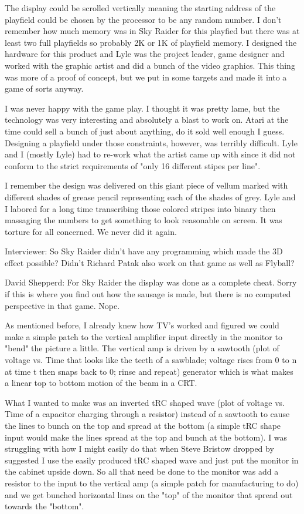 The display could be scrolled vertically meaning the starting address of the playfield could be chosen by the processor to be any random number. I don't remember how much memory was in Sky Raider for this playfied but there was at least two full playfields so probably 2K or 1K of playfield memory. I designed the hardware for this product and Lyle was the project leader, game designer and worked with the graphic artist and did a bunch of the video graphics. This thing was more of a proof of concept, but we put in some targets and made it into a game of sorts anyway. 

I was never happy with the game play. I thought it was pretty lame, but the technology was very interesting and absolutely a blast to work on. Atari at the time could sell a bunch of just about anything, do it sold well enough I guess. Designing a playfield under those constraints, however, was terribly difficult. Lyle and I (mostly Lyle) had to re-work what the artist came up with since it did not conform to the strict requirements of "only 16 different stipes per line". 

I remember the design was delivered on this giant piece of vellum marked with different shades of grease pencil representing each of the shades of grey. Lyle and I labored for a long time transcribing those colored stripes into binary then massaging the numbers to get something to look reasonable on screen. It was torture for all concerned. We never did it again.

\textcolor{interviewer}{Interviewer:} So Sky Raider didn’t have any programming which made the 3D effect possible? Didn’t Richard Patak also work on that game as well as Flyball?

\textcolor{interviewee}{David Shepperd:} For Sky Raider the display was done as a complete cheat. Sorry if this is where you find out how the sausage is made, but there is no computed perspective in that game. Nope. 

As mentioned before, I already knew how TV's worked and figured we could make a simple patch to the vertical amplifier input directly in the monitor to "bend" the picture a little. The vertical amp is driven by a sawtooth (plot of voltage vs. Time that looks like the teeth of a sawblade; voltage rises from 0 to n at time t then snaps back to 0; rinse and repeat) generator which is what makes a linear top to bottom motion of the beam in a CRT. 

What I wanted to make was an inverted tRC shaped wave (plot of voltage vs. Time of a capacitor charging through a resistor) instead of a sawtooth to cause the lines to bunch on the top and spread at the bottom (a simple tRC shape input would make the lines spread at the top and bunch at the bottom). I was struggling with how I might easily do that when Steve Bristow dropped by suggested I use the easily produced tRC shaped wave and just put the monitor in the cabinet upside down. So all that need be done to the monitor was add a resistor to the input to the vertical amp (a simple patch for manufacturing to do) and we get bunched horizontal lines on the "top" of the monitor that spread out towards the "bottom". 

